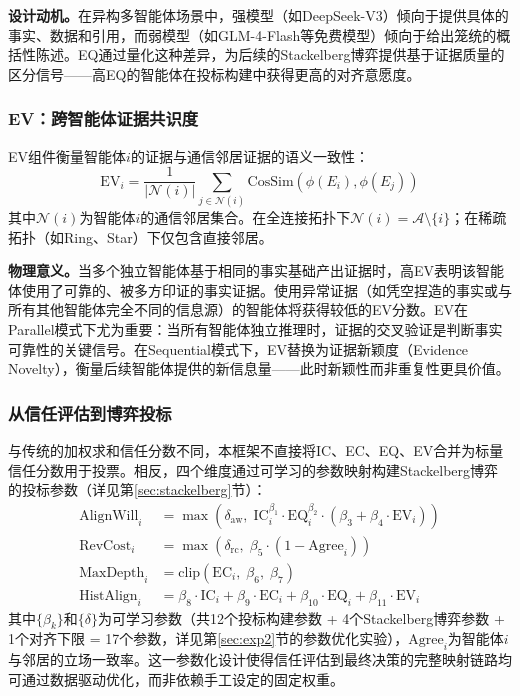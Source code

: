 \documentclass[12pt,a4paper,UTF8,fontset=fandol]{ctexart}
\begin{document}
\textbf{设计动机。}在异构多智能体场景中，强模型（如DeepSeek-V3）倾向于提供具体的事实、数据和引用，而弱模型（如GLM-4-Flash等免费模型）倾向于给出笼统的概括性陈述。EQ通过量化这种差异，为后续的Stackelberg博弈提供基于证据质量的区分信号——高EQ的智能体在投标构建中获得更高的对齐意愿度。

\subsubsection{EV：跨智能体证据共识度}

EV组件衡量智能体$i$的证据与通信邻居证据的语义一致性：
\begin{equation}\label{eq:ev}
\text{EV}_i = \frac{1}{|\mathcal{N}(i)|} \sum_{j \in \mathcal{N}(i)} \text{CosSim}(\phi(E_i), \phi(E_j))
\end{equation}
其中$\mathcal{N}(i)$为智能体$i$的通信邻居集合。在全连接拓扑下$\mathcal{N}(i) = \mathcal{A} \setminus \{i\}$；在稀疏拓扑（如Ring、Star）下仅包含直接邻居。

\textbf{物理意义。}当多个独立智能体基于相同的事实基础产出证据时，高EV表明该智能体使用了可靠的、被多方印证的事实证据。使用异常证据（如凭空捏造的事实或与所有其他智能体完全不同的信息源）的智能体将获得较低的EV分数。EV在Parallel模式下尤为重要：当所有智能体独立推理时，证据的交叉验证是判断事实可靠性的关键信号。在Sequential模式下，EV替换为证据新颖度（Evidence Novelty），衡量后续智能体提供的新信息量——此时新颖性而非重复性更具价值。

\subsubsection{从信任评估到博弈投标}

与传统的加权求和信任分数不同，本框架不直接将IC、EC、EQ、EV合并为标量信任分数用于投票。相反，四个维度通过可学习的参数映射构建Stackelberg博弈的投标参数（详见第\ref{sec:stackelberg}节）：
\begin{align}
\text{AlignWill}_i &= \max\!\left(\delta_{\text{aw}},\; \text{IC}_i^{\beta_1} \cdot \text{EQ}_i^{\beta_2} \cdot (\beta_3 + \beta_4 \cdot \text{EV}_i)\right) \label{eq:bid_aw} \\
\text{RevCost}_i &= \max\!\left(\delta_{\text{rc}},\; \beta_5 \cdot (1 - \text{Agree}_i)\right) \label{eq:bid_rc} \\
\text{MaxDepth}_i &= \text{clip}(\text{EC}_i,\; \beta_6,\; \beta_7) \label{eq:bid_mrd} \\
\text{HistAlign}_i &= \beta_8 \cdot \text{IC}_i + \beta_9 \cdot \text{EC}_i + \beta_{10} \cdot \text{EQ}_i + \beta_{11} \cdot \text{EV}_i \label{eq:bid_ha}
\end{align}
其中$\{\beta_k\}$和$\{\delta\}$为可学习参数（共12个投标构建参数 + 4个Stackelberg博弈参数 + 1个对齐下限 = 17个参数，详见第\ref{sec:exp2}节的参数优化实验），$\text{Agree}_i$为智能体$i$与邻居的立场一致率。这一参数化设计使得信任评估到最终决策的完整映射链路均可通过数据驱动优化，而非依赖手工设定的固定权重。
\end{document}
